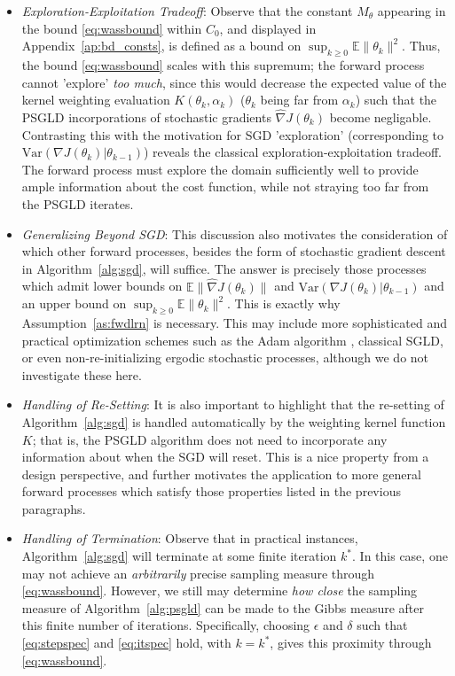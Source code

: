 \documentclass[journal,onecolumn]{IEEEtran}
\newcommand{\alk}{\alpha_k}
\newcommand{\thk}{\theta_k}
\newcommand{\grad}{\nabla}
\newcommand{\gradn}{\hat{\nabla}}
\newcommand{\rew}{J}
\newcommand{\CE}{\mathbb{E}}
\newcommand{\etsup}{M_{\theta}}
\newcommand{\ks}{k^*}
\begin{document}
{\begin{itemize}
    \item[-] \textit{Exploration-Exploitation Tradeoff}: Observe that the constant $\etsup$ appearing in the bound \eqref{eq:wassbound} within $C_0$, and displayed in Appendix~\ref{ap:bd_consts}, is defined as a bound on $\sup_{k\geq 0}\CE\|\thk\|^2$. Thus, the bound \eqref{eq:wassbound} scales with this supremum; the forward process cannot 'explore' \textit{too much}, since this would decrease the expected value of the kernel weighting evaluation $K(\thk,\alk)$ ($\thk$ being far from $\alk$) such that the PSGLD incorporations of stochastic gradients $\gradn\rew(\thk)$ become negligable. Contrasting this with the motivation for SGD 'exploration' (corresponding to $\textrm{Var}(\grad\rew(\thk)|\theta_{k-1})$) reveals the classical exploration-exploitation tradeoff. The forward process must explore the domain sufficiently well to provide ample information about the cost function, while not straying too far from the PSGLD iterates.

    \item[-] \textit{Generalizing Beyond SGD}: This discussion also motivates the consideration of which other forward processes, besides the form of stochastic gradient descent in Algorithm~\ref{alg:sgd}, will suffice. The answer is precisely those processes which admit lower bounds on $\CE\|\gradn\rew(\thk)\|$ and $\textrm{Var}(\grad\rew(\thk) | \theta_{k-1})$ and an upper bound on $\sup_{k\geq 0} \CE\|\thk\|^2$. This is exactly why Assumption~\ref{as:fwdlrn} is necessary. This may include more sophisticated and practical optimization schemes such as the Adam algorithm \cite{kingma2014adam}, classical SGLD, or even non-re-initializing ergodic stochastic processes, although we do not investigate these here.

    \item[-] \textit{Handling of Re-Setting}: It is also important to highlight that the re-setting of Algorithm~\ref{alg:sgd} is handled automatically by the weighting kernel function $K$; that is, the PSGLD algorithm does not need to incorporate any information about when the SGD will reset. This is a nice property from a design perspective, and further motivates the application to more general forward processes which satisfy those properties listed in the previous paragraphs.

   \item[-] \textit{Handling of Termination}: Observe that in practical instances, Algorithm~\ref{alg:sgd} will terminate at some finite iteration $\ks$. In this case, one may not achieve an \textit{arbitrarily} precise sampling measure through \eqref{eq:wassbound}. However, we still may determine \textit{how close} the sampling measure of Algorithm~\ref{alg:psgld} can be made to the Gibbs measure after this finite number of iterations. Specifically, choosing $\epsilon$ and $\delta$ such that \eqref{eq:stepspec} and \eqref{eq:itspec} hold, with $k=\ks$, gives this proximity through \eqref{eq:wassbound}.
\end{itemize}}
\end{document}
